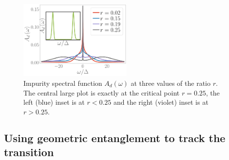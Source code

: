 \documentclass[reprint,superscriptaddress,floatfix]{revtex4-2}
\begin{document}
\begin{figure}[!htb]
	\centering
	\includegraphics[width=0.5\textwidth]{Add.pdf}
	\caption{Impurity spectral function \(A_d(\omega)\) at three values of the ratio \(r\). The central large plot is exactly at the critical point \(r=0.25\), the left (blue) inset is at \(r < 0.25\) and the right (violet) inset is at \(r > 0.25\).}
	\label{spec-func}
\end{figure}

\subsection{Using geometric entanglement to track the transition}
\end{document}
